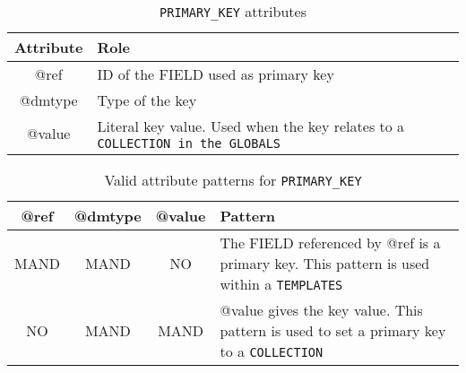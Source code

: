 \begin{table}[!htbp]
\small
\centering
\begin{tabulary}{\linewidth}{|c|J|}       
       \hline 
            \textbf{Attribute} & 
            \textbf {Role}\\
       \hline         \hline  
            @ref& 
            ID of the FIELD used as primary key \\
        \hline 
            @dmtype & 
            Type of the key \\
        \hline 
            @value & 
            Literal key value. Used when the key relates to a \texttt{COLLECTION in the \texttt{GLOBALS}} \\
        \hline 
     \end{tabulary}
     \caption{\texttt{PRIMARY\_KEY} attributes} 
     \label{tbl:primarykey-att}
 \end{table}

\begin{table}[!htbp]
\small
\centering
\begin{tabulary}{\linewidth}{|c|c|c|J|}
    \hline 
        \textbf{@ref} &
        \textbf{@dmtype} &
        \textbf{@value} &
        \textbf{Pattern}\\
    \hline      \hline  
        MAND &           
        MAND &           
        NO &           
        The FIELD referenced by @ref is a primary key. This pattern is used within a \texttt{TEMPLATES} \\
    \hline     
        NO &           
        MAND &           
        MAND &           
        @value gives the key value. This pattern is used to set a primary key to a \texttt{COLLECTION}\\
   \hline 
\end{tabulary}
     \caption{Valid attribute patterns for  \texttt{PRIMARY\_KEY}}
     \label{tbl:primarykey-pattern}
\end{table}